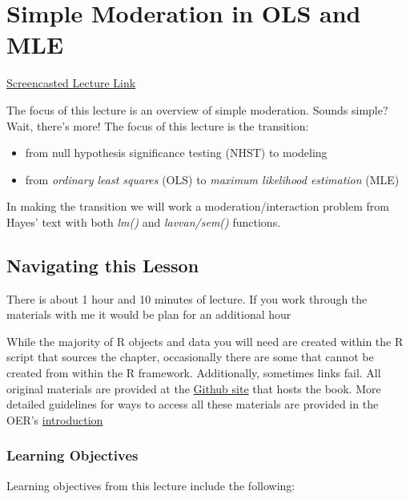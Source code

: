 \documentclass[
  11pt,
]{book}
\providecommand{\tightlist}{%
  \setlength{\itemsep}{0pt}\setlength{\parskip}{0pt}}
\begin{document}
\hypertarget{SimpMod}{%
\chapter{Simple Moderation in OLS and MLE}\label{SimpMod}}

\href{https://spu.hosted.panopto.com/Panopto/Pages/Viewer.aspx?pid=cc098142-3693-4366-bb55-ad1d0175414e}{Screencasted Lecture Link}

The focus of this lecture is an overview of simple moderation. Sounds simple? Wait, there's more! The focus of this lecture is the transition:

\begin{itemize}
\tightlist
\item
  from null hypothesis significance testing (NHST) to modeling
\item
  from \emph{ordinary least squares} (OLS) to \emph{maximum likelihood estimation} (MLE)
\end{itemize}

In making the transition we will work a moderation/interaction problem from Hayes' text with both \emph{lm()} and \emph{lavvan/sem()} functions.

\hypertarget{navigating-this-lesson-6}{%
\section{Navigating this Lesson}\label{navigating-this-lesson-6}}

There is about 1 hour and 10 minutes of lecture. If you work through the materials with me it would be plan for an additional hour

While the majority of R objects and data you will need are created within the R script that sources the chapter, occasionally there are some that cannot be created from within the R framework. Additionally, sometimes links fail. All original materials are provided at the \href{https://github.com/lhbikos/ReC_MultivModel}{Github site} that hosts the book. More detailed guidelines for ways to access all these materials are provided in the OER's \protect\hyperlink{ReCintro}{introduction}

\hypertarget{learning-objectives-6}{%
\subsection{Learning Objectives}\label{learning-objectives-6}}

Learning objectives from this lecture include the following:
\end{document}
